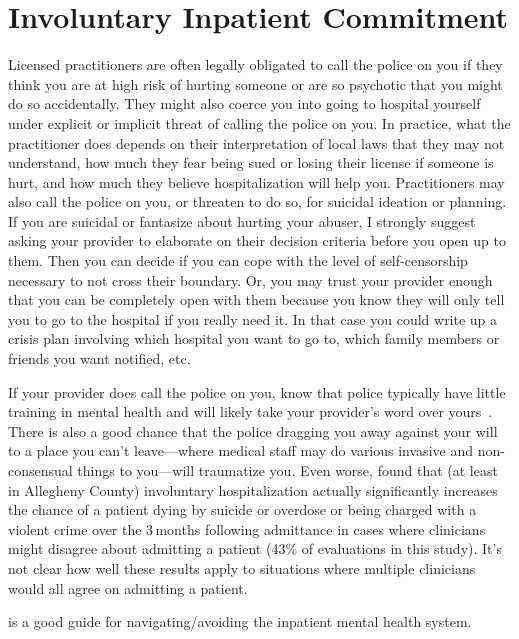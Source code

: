 \documentclass[11pt,oneside]{book}
\let\cite\parencite
\begin{document}
\section{Involuntary Inpatient Commitment}
\label{suicideCops}
Licensed practitioners are often legally obligated to call the police on you if they think you are at high risk of hurting someone or are so psychotic that you might do so accidentally. They might also coerce you into going to hospital yourself under explicit or implicit threat of calling the police on you. In practice, what the practitioner does depends on their interpretation of local laws that they may not understand, how much they fear being sued or losing their license if someone is hurt, and how much they believe hospitalization will help you. Practitioners may also call the police on you, or threaten to do so, for suicidal ideation or planning. If you are suicidal or fantasize about hurting your abuser, I strongly suggest asking your provider to elaborate on their decision criteria before you open up to them. Then you can decide if you can cope with the level of self-censorship necessary to not cross their boundary. Or, you may trust your provider enough that you can be completely open with them because you know they will only tell you to go to the hospital if you really need it. In that case you could write up a crisis plan involving which hospital you want to go to, which family members or friends you want notified, etc.

If your provider does call the police on you, know that police typically have little training in mental health and will likely take your provider's word over yours~\cite{alexanderInpatient}. There is also a good chance that the police dragging you away against your will to a place you can't leave---where medical staff may do various invasive and non-consensual things to you---will traumatize you. Even worse, \textcite{emanuelHospitalization} found that (at least in Allegheny County) involuntary hospitalization actually significantly increases the chance of a patient dying by suicide or overdose or being charged with a violent crime over the 3\,months following admittance in cases where clinicians might disagree about admitting a patient (43\% of evaluations in this study). It's not clear how well these results apply to situations where multiple clinicians would all agree on admitting a patient.

\textcite{alexanderInpatient} is a good guide for navigating/avoiding the inpatient mental health system.
\end{document}
